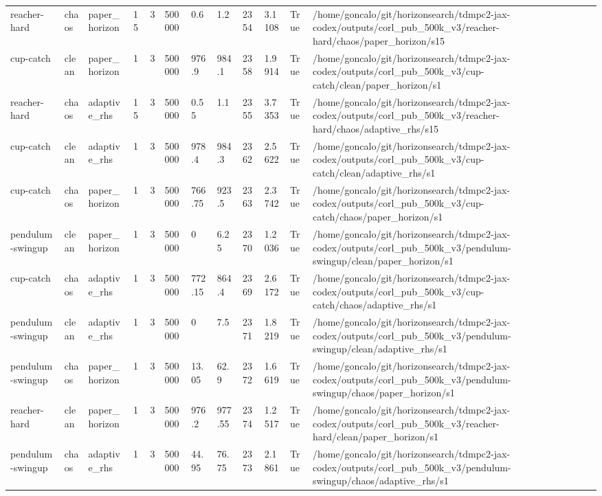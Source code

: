 \begin{tabular}{llllllllllll}
reacher-hard & chaos & paper\_horizon & 15 & 3 & 500000 & 0.6 & 1.2 & 2354 & 3.1108 & True & /home/goncalo/git/horizonsearch/tdmpc2-jax-codex/outputs/corl\_pub\_500k\_v3/reacher-hard/chaos/paper\_horizon/s15 \\
cup-catch & clean & paper\_horizon & 1 & 3 & 500000 & 976.9 & 984.1 & 2358 & 1.9914 & True & /home/goncalo/git/horizonsearch/tdmpc2-jax-codex/outputs/corl\_pub\_500k\_v3/cup-catch/clean/paper\_horizon/s1 \\
reacher-hard & chaos & adaptive\_rhs & 15 & 3 & 500000 & 0.55 & 1.1 & 2355 & 3.7353 & True & /home/goncalo/git/horizonsearch/tdmpc2-jax-codex/outputs/corl\_pub\_500k\_v3/reacher-hard/chaos/adaptive\_rhs/s15 \\
cup-catch & clean & adaptive\_rhs & 1 & 3 & 500000 & 978.4 & 984.3 & 2362 & 2.5622 & True & /home/goncalo/git/horizonsearch/tdmpc2-jax-codex/outputs/corl\_pub\_500k\_v3/cup-catch/clean/adaptive\_rhs/s1 \\
cup-catch & chaos & paper\_horizon & 1 & 3 & 500000 & 766.75 & 923.5 & 2363 & 2.3742 & True & /home/goncalo/git/horizonsearch/tdmpc2-jax-codex/outputs/corl\_pub\_500k\_v3/cup-catch/chaos/paper\_horizon/s1 \\
pendulum-swingup & clean & paper\_horizon & 1 & 3 & 500000 & 0 & 6.25 & 2370 & 1.2036 & True & /home/goncalo/git/horizonsearch/tdmpc2-jax-codex/outputs/corl\_pub\_500k\_v3/pendulum-swingup/clean/paper\_horizon/s1 \\
cup-catch & chaos & adaptive\_rhs & 1 & 3 & 500000 & 772.15 & 864.4 & 2369 & 2.6172 & True & /home/goncalo/git/horizonsearch/tdmpc2-jax-codex/outputs/corl\_pub\_500k\_v3/cup-catch/chaos/adaptive\_rhs/s1 \\
pendulum-swingup & clean & adaptive\_rhs & 1 & 3 & 500000 & 0 & 7.5 & 2371 & 1.8219 & True & /home/goncalo/git/horizonsearch/tdmpc2-jax-codex/outputs/corl\_pub\_500k\_v3/pendulum-swingup/clean/adaptive\_rhs/s1 \\
pendulum-swingup & chaos & paper\_horizon & 1 & 3 & 500000 & 13.05 & 62.9 & 2372 & 1.6619 & True & /home/goncalo/git/horizonsearch/tdmpc2-jax-codex/outputs/corl\_pub\_500k\_v3/pendulum-swingup/chaos/paper\_horizon/s1 \\
reacher-hard & clean & paper\_horizon & 1 & 3 & 500000 & 976.2 & 977.55 & 2374 & 1.2517 & True & /home/goncalo/git/horizonsearch/tdmpc2-jax-codex/outputs/corl\_pub\_500k\_v3/reacher-hard/clean/paper\_horizon/s1 \\
pendulum-swingup & chaos & adaptive\_rhs & 1 & 3 & 500000 & 44.95 & 76.75 & 2373 & 2.1861 & True & /home/goncalo/git/horizonsearch/tdmpc2-jax-codex/outputs/corl\_pub\_500k\_v3/pendulum-swingup/chaos/adaptive\_rhs/s1 \\

\end{tabular}
